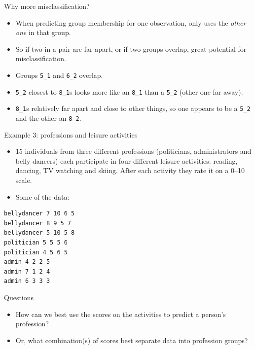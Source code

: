 \documentclass[ignorenonframetext,]{beamer}
\begin{document}
\begin{frame}[fragile]{Why more misclassification?}
\protect\hypertarget{why-more-misclassification}{}

\begin{itemize}
\item
  When predicting group membership for one observation, only uses the
  \emph{other one} in that group.
\item
  So if two in a pair are far apart, or if two groups overlap, great
  potential for misclassification.
\item
  Groups \texttt{5\_1} and \texttt{6\_2} overlap.
\item
  \texttt{5\_2} closest to \texttt{8\_1}s looks more like an
  \texttt{8\_1} than a \texttt{5\_2} (other one far away).
\item
  \texttt{8\_1}s relatively far apart and close to other things, so one
  appears to be a \texttt{5\_2} and the other an \texttt{8\_2}.
\end{itemize}

\end{frame}

\begin{frame}[fragile]{Example 3: professions and leisure activities}
\protect\hypertarget{example-3-professions-and-leisure-activities}{}

\begin{itemize}
\item
  15 individuals from three different professions (politicians,
  administrators and belly dancers) each participate in four different
  leisure activities: reading, dancing, TV watching and skiing. After
  each activity they rate it on a 0--10 scale.
\item
  Some of the data:
\end{itemize}

\normalsize

\begin{verbatim}
bellydancer 7 10 6 5
bellydancer 8 9 5 7
bellydancer 5 10 5 8
politician 5 5 5 6
politician 4 5 6 5
admin 4 2 2 5
admin 7 1 2 4
admin 6 3 3 3
\end{verbatim}

\normalsize

\end{frame}

\begin{frame}{Questions}
\protect\hypertarget{questions}{}

\begin{itemize}
\item
  How can we best use the scores on the activities to predict a person's
  profession?
\item
  Or, what combination(s) of scores best separate data into profession
  groups?
\end{itemize}

\end{frame}
\end{document}

